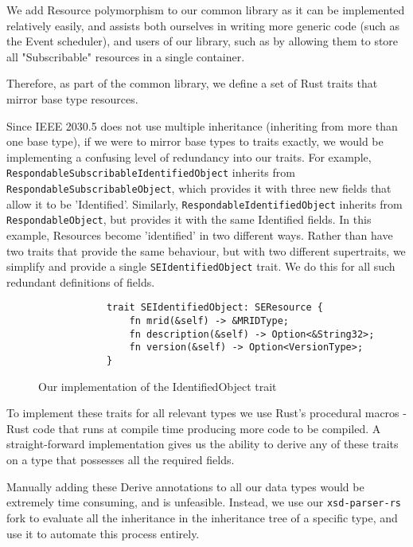 We add Resource polymorphism to our common library as it can be implemented relatively easily, and assists both ourselves in writing more generic code (such as the Event scheduler), and users of our library, such as by allowing them to store all "Subscribable" resources in a single container.

Therefore, as part of the common library, we define a set of Rust traits that mirror base type resources. 

Since IEEE 2030.5 does not use multiple inheritance (inheriting from more than one base type), if we were to mirror base types to traits exactly, we would be implementing a confusing level of redundancy into our traits.
For example, \texttt{RespondableSubscribableIdentifiedObject} inherits from \texttt{RespondableSubscribableObject}, which provides it with three new fields that allow it to be 'Identified'. Similarly, \texttt{RespondableIdentifiedObject} inherits from \texttt{RespondableObject}, but provides it with the same Identified fields. In this example, Resources become 'identified' in two different ways. Rather than have two traits that provide the same behaviour, but with two different supertraits, we simplify and provide a single \texttt{SEIdentifiedObject} trait. We do this for all such redundant definitions of fields.

\begin{figure}[H]
    \begin{center}
        \begin{lstlisting}
            trait SEIdentifiedObject: SEResource {
                fn mrid(&self) -> &MRIDType;
                fn description(&self) -> Option<&String32>;
                fn version(&self) -> Option<VersionType>;
            }
        \end{lstlisting}
        \label{fig:identtrait}
        \caption{Our implementation of the IdentifiedObject trait}
    \end{center}
\end{figure}

To implement these traits for all relevant types we use Rust's procedural macros - Rust code that runs at compile time producing more code to be compiled. A straight-forward implementation gives us the ability to derive any of these traits on a type that possesses all the required fields.

Manually adding these Derive annotations to all our data types would be extremely time consuming, and is unfeasible. Instead, we use our \texttt{xsd-parser-rs} fork to evaluate all the inheritance in the inheritance tree of a specific type, and use it to automate this process entirely. 

